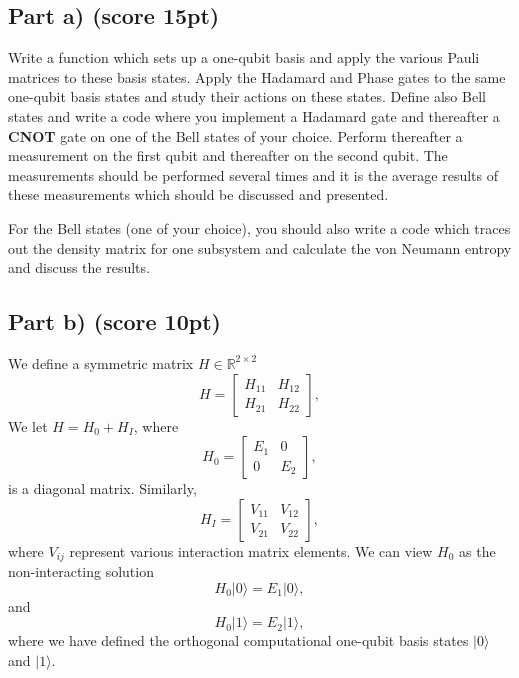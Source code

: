 \documentclass[%
oneside,                 %
final,                   %
10pt]{article}
\begin{document}
\subsection{Part a) (score 15pt)}

Write a function which sets up a one-qubit basis and apply the various
Pauli matrices to these basis states.  Apply the Hadamard and Phase
gates to the same one-qubit basis states and study their actions on
these states. Define also Bell states and write a code where you
implement a Hadamard gate and thereafter a \textbf{CNOT} gate on one of the Bell
states of your choice. Perform thereafter a measurement on the first qubit and
thereafter on the second qubit. The measurements should be performed 
several times and it is the average results of these measurements
which should be discussed and presented.

For the Bell states (one of your choice), you should also write a code
which traces out the density matrix for one subsystem and calculate
the von Neumann entropy and discuss the results.


\subsection{Part b) (score 10pt)}

We define a  symmetric matrix  $H\in {\mathbb{R}}^{2\times 2}$
\[
H = \begin{bmatrix} H_{11} & H_{12} \\ H_{21} & H_{22}
\end{bmatrix},
\]
We  let $H = H_0 + H_I$, where
\[
H_0= \begin{bmatrix} E_1 & 0 \\ 0 & E_2\end{bmatrix},
\]
is a diagonal matrix. Similarly,
\[
H_I= \begin{bmatrix} V_{11} & V_{12} \\ V_{21} & V_{22}\end{bmatrix},
\]
where $V_{ij}$ represent various interaction matrix elements.
We can view $H_0$ as the non-interacting solution
\begin{equation}
       H_0\vert 0 \rangle =E_1\vert 0 \rangle,
\end{equation}
and
\begin{equation}
       H_0\vert 1\rangle =E_2\vert 1\rangle,
\end{equation}
where we have defined the orthogonal computational one-qubit basis states $\vert 0\rangle$ and $\vert 1\rangle$.
\end{document}
